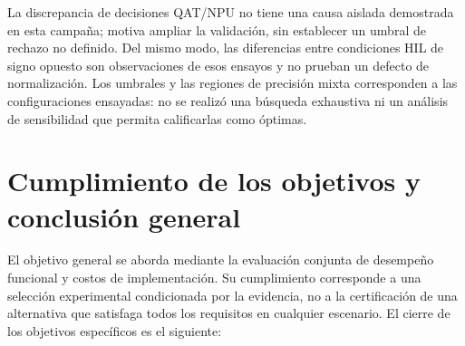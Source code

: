 La discrepancia de decisiones QAT/NPU no tiene una causa aislada demostrada en esta campaña; motiva ampliar la validación, sin establecer un umbral de rechazo no definido. Del mismo modo, las diferencias entre condiciones HIL de signo opuesto son observaciones de esos ensayos y no prueban un defecto de normalización. Los umbrales y las regiones de precisión mixta corresponden a las configuraciones ensayadas: no se realizó una búsqueda exhaustiva ni un análisis de sensibilidad que permita calificarlas como óptimas.

\section{Cumplimiento de los objetivos y conclusión general}\label{sec:cierre_objetivos}
El objetivo general se aborda mediante la evaluación conjunta de desempeño funcional y costos de implementación. Su cumplimiento corresponde a una selección experimental condicionada por la evidencia, no a la certificación de una alternativa que satisfaga todos los requisitos en cualquier escenario. El cierre de los objetivos específicos es el siguiente:

